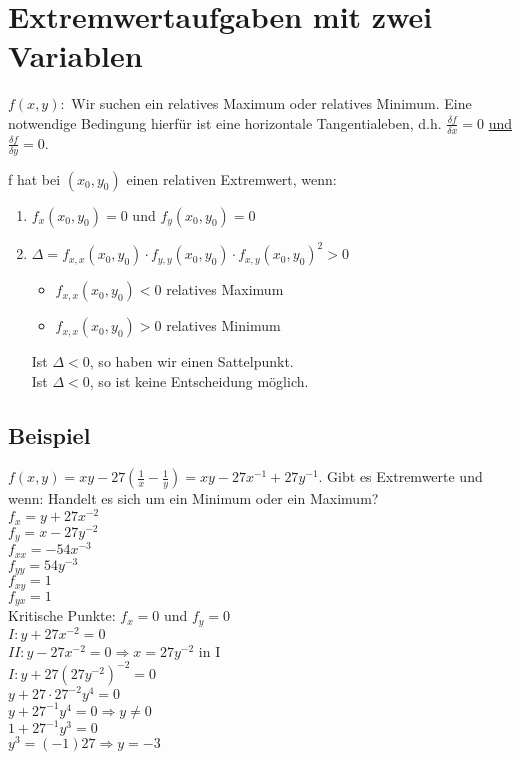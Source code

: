 \section{Extremwertaufgaben mit zwei Variablen}
$ f(x,y): $ Wir suchen ein relatives Maximum oder relatives Minimum. Eine notwendige Bedingung hierfür ist eine horizontale Tangentialeben, d.h. $ \frac{\delta f}{\delta x} = 0 $ \underline{und} $ \frac{\delta f}{\delta y} = 0 $. 

\begin{satz}[Rezept]
f hat bei $ (x_0,y_0)$ einen relativen Extremwert, wenn: 
\begin{enumerate}
\item $f_x(x_0,y_0) = 0$ und $f_y(x_0,y_0) = 0$
\item $\Delta = f_{x,x}(x_0,y_0)\cdot f_{y,y}(x_0,y_0)\cdot f_{x,y}(x_0,y_0)^2 > 0 $
	\begin{itemize}
	\item $f_{x,x}(x_0,y_0) < 0$ relatives Maximum 
	\item $f_{x,x}(x_0,y_0) > 0$ relatives Minimum
	\end{itemize}
	Ist $\Delta < 0$, so haben wir einen Sattelpunkt.\\
	Ist $\Delta < 0$, so ist keine Entscheidung möglich. 
\end{enumerate}
\end{satz}

\subsection{Beispiel}
$ f(x,y)= x y - 27(\frac{1}{x} - \frac{1}{y}) = x y - 27 x^{-1} + 27 y^{-1}$. 
Gibt es Extremwerte und wenn: Handelt es sich um ein Minimum oder ein Maximum?\\

$f_x = y + 27 x^{-2}$\\
$f_y = x - 27 y^{-2}$\\
$f_{xx} = -54 x^{-3}$\\
$f_{yy} = 54 y^{-3}$\\
$f_{xy} = 1$\\
$f_{yx} = 1$\\
Kritische Punkte: $f_x=0$ und $f_y=0$\\
$I: y+27x^{-2}=0$\\
$II: y-27x^{-2}=0 \Rightarrow x = 27 y ^{-2} $ in I\\
$I: y+27(27 y^{-2})^{-2} = 0 $\\
$y+27 \cdot 27^{-2} y^4 = 0 $\\
$y+27^{-1} y^4 = 0 \Rightarrow y \neq 0$\\
$1+27^{-1} y^3=0$\\
$y^3=(-1)27 \Rightarrow y=-3$\\


